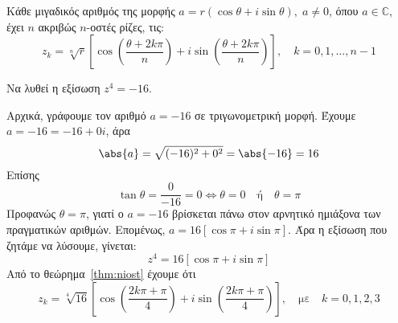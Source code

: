 \begin{mybox2}
  \begin{thm}\label{thm:niost}
    Κάθε μιγαδικός αριθμός της μορφής $a=r(\cos\theta+i\sin\theta), \; a\neq 0$,
    όπου $ a \in \mathbb{C} $, έχει $n$ ακριβώς $n$-οστές ρίζες, τις: 
    \[
      \boxed{z_{k}=\sqrt[n]{r}\left[ \cos\left(\frac{\theta+2k\pi}{n}\right)+i
      \sin\left(\frac{\theta+2k\pi}{n}\right) \right], \quad k=0,1,\ldots, n-1}
    \]
  \end{thm}
\end{mybox2}

\begin{example}
  Να λυθεί η εξίσωση $ z^{4} = -16 $. 
\end{example}
\begin{solution}
  Αρχικά, γράφουμε τον αριθμό $ a = -16 $ σε τριγωνομετρική μορφή. Έχουμε 
  $ a=-16=-16+0i $, άρα 
  \[ 
    \abs{a} = \sqrt{(-16)^{2}+0^2} = \abs{-16} = 16 
  \] 
  Επίσης
  \[
    \tan{\theta} = \frac{0}{-16} = 0 \Leftrightarrow \theta =0 \quad
    \text{ή} \quad \theta = \pi
  \] 
  Προφανώς $ \theta = \pi $, γιατί ο $a=-16$ βρίσκεται πάνω στον αρνητικό 
  ημιάξονα των πραγματικών αριθμών. Επομένως, $ a = 16[\cos{\pi} + i
  \sin{\pi}] $. Άρα η εξίσωση που ζητάμε να λύσουμε, γίνεται:
  \[
    z^{4} = 16 [\cos{\pi} + i \sin{\pi}] 
  \] 
  Από το θεώρημα~\ref{thm:niost} έχουμε ότι
  \[
    z_{k} = \sqrt[4]{16} \left[\cos{\left(\frac{2k \pi + \pi}{4}\right)} + i
    \sin{\left(\frac{2k \pi + \pi}{ 4}\right)}\right], 
    \quad \text{με} \quad k=0,1,2,3
  \] 
\end{solution}






